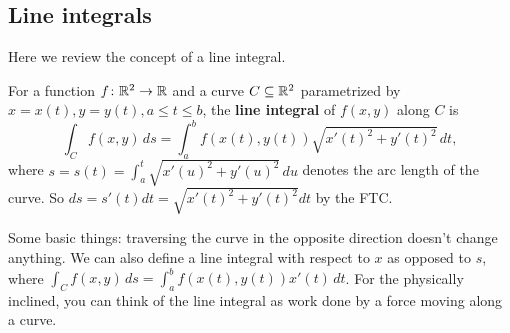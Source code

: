 \subsection{Line integrals}
Here we review the concept of a line integral.
\begin{definition}\label{cfield}
    For a function $f\colon \mathbb{R}^2 \to \mathbb{R}$ and a curve $C\subseteq \mathbb{R}^2$ parametrized by $x=x(t), y=y(t),a\leq t \leq b$, the \textbf{line integral} of $f(x,y)$ along $C$ is \[
        \int_{C}^{} f(x,y) \, ds=\int_{a}^{b} f(x(t),y(t)) \sqrt{x'(t)^2+y'(t)^2}  \, dt,
    \] where $s=s(t)=\int_{a}^{t} \sqrt{x'(u)^2+y'(u)^2}  \, du$ denotes the arc length of the curve. So $ds=s'(t)dt=\sqrt{x'(t)^2+y'(t)^2} dt$ by the FTC.
\end{definition}
Some basic things: traversing the curve in the opposite direction doesn't change anything. We can also define a line integral with respect to $x$ as opposed to $s$, where $\int_{C}^{} f(x,y) \, ds=\int_{a}^{b} f(x(t),y(t))x'(t) \, dt$. For the physically inclined, you can think of the line integral as work done by a force moving along a curve.

